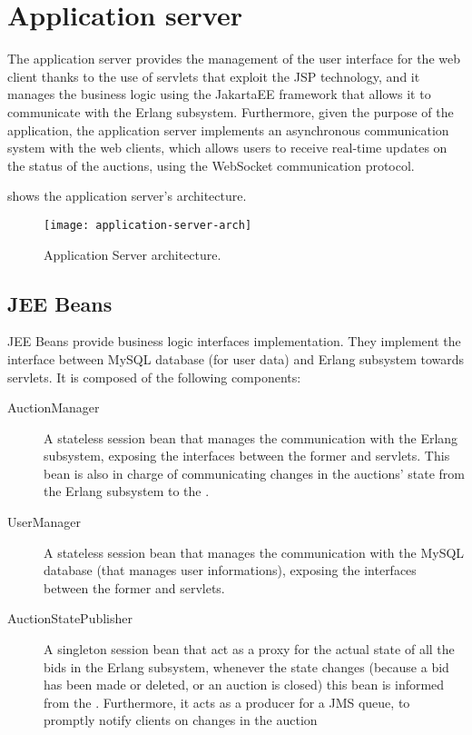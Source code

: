 \section{Application server}\label{sec:archserver}

The application server provides the management of the user interface for the web
client thanks to the use of servlets that exploit the JSP technology, and it
manages the business logic using the JakartaEE framework that allows it to
communicate with the Erlang subsystem. Furthermore, given the purpose of the
application, the application server implements an asynchronous communication
system with the web clients, which allows users to receive real-time updates on
the status of the auctions, using the WebSocket communication protocol.

 shows the application server's
architecture.

\begin{figure}[htb]
	\centering
	\texttt{[image: application-server-arch]}
	\caption{Application Server
	architecture.}\label{fig:application-server-arch}
\end{figure}

\subsection{JEE Beans}

JEE Beans provide business logic interfaces implementation. They implement the
interface between MySQL database (for user data) and Erlang subsystem towards
servlets. It is composed of the following components:

\begin{description}
	\item[AuctionManager] A stateless session bean that manages the
		communication with the Erlang subsystem, exposing the interfaces
		between the former and servlets. This bean is also in charge of
		communicating changes in the auctions’ state from the Erlang
		subsystem to the .
	\item[UserManager] A stateless session bean that manages the
		communication with the MySQL database (that manages user
		informations), exposing the interfaces between the former and
		servlets.
	\item[AuctionStatePublisher] A singleton session bean that act as a
		proxy for the actual state of all the bids in the Erlang
		subsystem, whenever the state changes (because a bid has been
		made or deleted, or an auction is closed) this bean is informed
		from the . Furthermore, it acts as a
		producer for a JMS queue, to promptly notify clients on changes
		in the auction
\end{description}

